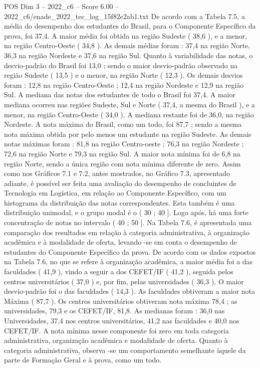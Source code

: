 \begin{textsample}{POS Dim 3 – 2022\_c6 – Score 6.00 – 2022\_c6/enade\_2022\_tec\_log\_15f82e2ab1.txt}
De acordo com a Tabela 7.5, a média do desempenho dos estudantes do Brasil, para o Componente Específico da prova, foi 37,4.
A maior média foi obtida na região Sudeste ( 38,6 ), e a menor, na região Centro-Oeste ( 34,8 ).
As demais médias foram : 37,4 na região Norte, 36,3 na região Nordeste e 37,6 na região Sul.
Quanto à variabilidade das notas, o desvio-padrão do Brasil foi 13,0 ; sendo o maior desvio-padrão observado na região Sudeste ( 13,5 ) e o menor, na região Norte ( 12,3 ).
Os demais desvios foram : 12,8 na região Centro-Oeste ; 12,4 na região Nordeste e 12,9 na região Sul.
A mediana das notas dos estudantes de todo o Brasil foi 37,4.
A maior mediana ocorreu nas regiões Sudeste, Sul e Norte ( 37,4, a mesma do Brasil ), e a menor, na região Centro-Oeste ( 34,0 ).
A mediana restante foi de 36,0, na região Nordeste.
A nota máxima do Brasil, como um todo, foi 87,7 ; sendo a mesma nota máxima obtida por pelo menos um estudante na região Sudeste.
As demais notas máximas foram : 81,8 na região Centro-oeste ; 76,3 na região Nordeste ; 72,6 na região Norte e 79,3 na região Sul.
A maior nota mínima foi de 6,8 na região Norte, sendo a única região com nota mínima diferente de zero.
Assim como nos Gráficos 7.1 e 7.2, antes mostrados, no Gráfico 7.3, apresentado adiante, é possível ser feita uma avaliação do desempenho de concluintes de Tecnologia em Logística, em relação ao Componente Específico, com um histograma da distribuição das notas correspondentes.
Esta também é uma distribuição unimodal, e o grupo modal é o ( 30 ; 40 ].
Logo após, há uma forte concentração de notas no intervalo ( 40 ; 50 ].
Na Tabela 7.6, é apresentada uma comparação dos resultados em relação à categoria administrativa, à organização acadêmica e à modalidade de oferta, levando -se em conta o desempenho de estudantes do Componente Específico da prova.
De acordo com os dados expostos na Tabela 7.6, no que se refere à organização acadêmica, a maior média foi a das faculdades ( 41,9 ), vindo a seguir a dos CEFET/IF ( 41,2 ), seguida pelos centros universitários ( 37,0 ) e, por fim, pelas universidades ( 36,3 ).
O maior desvio-padrão foi o das faculdades ( 14,3 ).
As faculdades obtiveram a maior nota Máxima ( 87,7 ).
Os centros universitários obtiveram nota máxima 78,4 ; as universidades, 79,3 e os CEFET/IF, 81,8.
As medianas foram : 36,0 nas Universidades, 37,4 nos centros universitários, 41,2 nas faculdades e 40,0 nos CEFET/IF.
A nota mínima nesse componente foi zero em toda categoria administrativa, organização acadêmica e modalidade de oferta.
Quanto à categoria administrativa, observa -se um comportamento semelhante àquele da parte de Formação Geral e à prova, como um todo.

\end{textsample}
